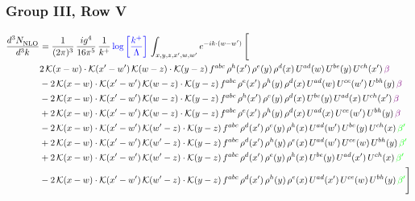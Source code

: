 \documentclass[9pt]{article}
\numberwithin{equation}{section}
\begin{document}
\subsubsection{Group III, Row V}     
\begin{align}
     \frac{d^{3}N_{\rm NLO}^{\rm}}{d^{3}k}  & = \frac{1}{(2\pi)^{3}}\, \frac{ig^{4}}{16\pi^{5}}\, \frac{1}{k^{+}}\, {\color{blue}\log{\left[\frac{k^{+}}{\Lambda}\right]}}\,\int_{x,y,z,x^{\prime},w,w^{\prime}}e^{-ik\cdot (w-w')}\, \Bigg[\notag \\ & 2\,\mathcal{K}(x-w)\cdot\mathcal{K}(x'-w')\,\mathcal{K}(w-z)\cdot\mathcal{K}(y-z)\, f^{abc}\,\rho^{h}(x')\,\rho^{e}(y)\,\rho^{d}(x)\,U^{ad}(w)\,U^{be}(y)\,U^{ch}(x')\,{\color{violet}\beta}\notag\\ &-2\,\mathcal{K}(x-w)\cdot\mathcal{K}(x'-w')\,\mathcal{K}(w-z)\cdot\mathcal{K}(y-z)\, f^{abc}\,\rho^{e}(x')\,\rho^{h}(y)\,\rho^{d}(x)\,U^{ad}(w)\,U^{ce}(w')\,U^{bh}(y)\,{\color{violet}\beta} \notag\\ & -2\,\mathcal{K}(x-w)\cdot\mathcal{K}(x'-w')\,\mathcal{K}(w-z)\cdot\mathcal{K}(y-z)\, f^{abc}\,\rho^{h}(x')\,\rho^{e}(y)\,\rho^{d}(x)\,U^{be}(y)\,U^{ad}(x)\,U^{ch}(x')\,{\color{violet}\beta} \notag\\ &+2\,\mathcal{K}(x-w)\cdot\mathcal{K}(x'-w')\,\mathcal{K}(w-z)\cdot\mathcal{K}(y-z)\, f^{abc}\,\rho^{e}(x')\,\rho^{h}(y)\,\rho^{d}(x)\,U^{ad}(x)\,U^{ce}(w')\,U^{bh}(y)\,{\color{violet}\beta}\notag \\ & -2\, \mathcal{K}(x-w) \cdot \mathcal{K}(x'-w')\, \mathcal{K}(w'-z) \cdot \mathcal{K}(y-z)\, f^{abc}\, \rho^{d}(x')\,\rho^{e}(y)\, \rho^{h}(x)\,U^{ad}(w')\,U^{be}(y)\,U^{ch}(x)\, {\color{green} \beta'}\notag \\ & + 2\, \mathcal{K}(x-w) \cdot \mathcal{K}(x'-w')\, \mathcal{K}(w'-z) \cdot \mathcal{K}(y-z)\, f^{abc}\, \rho^{d}(x')\,\rho^{h}(y)\, \rho^{e}(x)\,U^{ad}(w')\,U^{ce}(w)\,U^{bh}(y)\, {\color{green} \beta'}\notag \\ & +2\, \mathcal{K}(x-w) \cdot \mathcal{K}(x'-w')\, \mathcal{K}(w'-z) \cdot \mathcal{K}(y-z)\, f^{abc}\, \rho^{d}(x')\,\rho^{e}(y)\, \rho^{h}(x)\,U^{be}(y)\,U^{ad}(x')\,U^{ch}(x)\, {\color{green} \beta'}\notag \\ & -2\, \mathcal{K}(x-w) \cdot \mathcal{K}(x'-w')\, \mathcal{K}(w'-z) \cdot \mathcal{K}(y-z)\, f^{abc}\, \rho^{d}(x')\,\rho^{h}(y)\, \rho^{e}(x)\,U^{ad}(x')\,U^{ce}(w)\,U^{bh}(y)\, {\color{green} \beta'}\Bigg]
     \end{align} 
\end{document}
